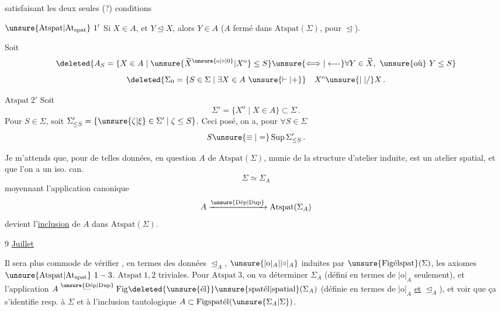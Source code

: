 
satisfaisant les deux seules (?) conditions

\uline{$\unsure{\mathrm{Atspat}|\mathrm{At}_{\mathrm{spat}}}\ 1'$} Si $X\in A$, et $Y\trianglelefteq X$, alors $Y\in A$
($A$ fermé dans $\mathrm{Atspat}(\Sigma)$, pour $\trianglelefteq$).

 Soit
\[
\deleted{A_S=\{X\in A\mid\unsure{\widetilde X^{\unsure{\mathrm{o}|\circ|0}}|X^{\mathrm{o}}}\leq S\}\unsure{\Longleftrightarrow|\longleftarrow}\forall Y\in\widetilde X,\ \unsure{\text{où}}\ Y\leq S}
\]
\[
\deleted{\Sigma_0=\{S\in\Sigma\mid\exists X\in A\ \unsure{\vdash|+}}\quad X^{\mathrm{o}}\unsure{\mid|/}X\,.
\]

\uline{$\mathrm{Atspat}\ 2'$}\quad {} Soit
\[
\Sigma'=\{X^{\mathrm{o}}\mid X\in A\}\subset\Sigma\,.
\]
Pour \deleted{$\unsure{\forall}$} $S\in\Sigma$, soit
$\Sigma'_{\leq S}=\{\unsure{\zeta|\xi}\in\Sigma'\mid\zeta\leq S\}$.
Ceci posé, on a, pour $\forall S\in\Sigma$
\[
S\unsure{\equiv|=}\operatorname{Sup}\Sigma'_{\leq S}\,.
\]

Je m'attends que, pour de telles données,   en question $A$ de $\mathrm{Atspat}(\Sigma)$, munie de la structure d'atelier induite, est un atelier spatial, et que l'on a un iso. can.
\[
\Sigma\simeq\Sigma_A
\]
moyennant l'application canonique
\[
A\xrightarrow{\unsure{\mathrm{D\acute ep}|\mathrm{Dup}}}\mathrm{Atspat}(\Sigma_A)
\]
devient l'\uline{inclusion} de $A$ dans $\mathrm{Atspat}(\Sigma)$.


9 \uline{Juillet}

Il sera plus commode de vérifier , en termes des données $\trianglelefteq_A$, $\unsure{|\mathrm{o}|_A|\lvert\circ\rvert_A}$ induites par $\unsure{\mathrm{Fig\acute elspat}}(\Sigma)$, les axiomes $\unsure{\mathrm{Atspat}|\mathrm{At}_{\mathrm{spat}}}\ 1-3$.
$\mathrm{Atspat}\ 1,2$ triviales. Pour $\mathrm{Atspat}\ 3$, on va déterminer  $\Sigma_A$ (défini en termes de $|\mathrm{o}|_A$ seulement), et l'application
$A\overset{\unsure{\mathrm{D\acute ep}|\mathrm{Dup}}}{\mathrel{\text{---}}}\mathrm{Fig}\deleted{\unsure{\mathrm{\acute el}}}\unsure{\mathrm{spat\acute el}|\mathrm{spatial}}(\Sigma_A)$
(définie en termes de $|\mathrm{o}|_A$ \uline{et} $\trianglelefteq_A$), et voir que ça s'identifie resp. à $\Sigma$ et à l'inclusion tautologique $A\subset\mathrm{Figspat\acute el}(\unsure{\Sigma_A|\Sigma})$.


